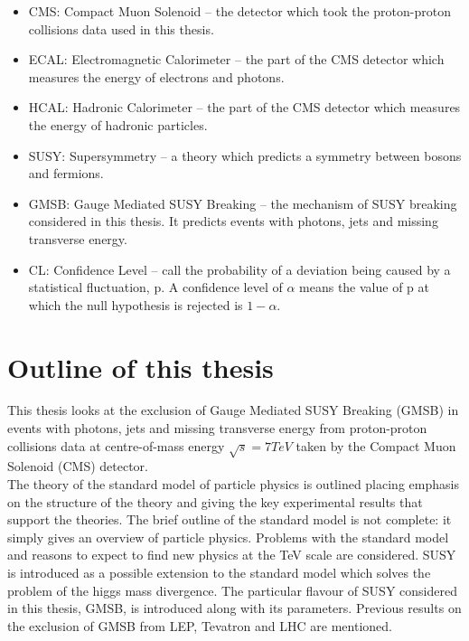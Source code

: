 \begin{itemize}
\item CMS: Compact Muon Solenoid -- the detector which took the proton-proton
collisions data used in this thesis.
\item ECAL: Electromagnetic Calorimeter -- the part of the CMS detector which 
measures the energy of electrons and photons.
\item HCAL: Hadronic Calorimeter -- the part of the CMS detector which measures
the energy of hadronic particles.
\item SUSY: Supersymmetry -- a theory which predicts a symmetry between bosons
and fermions. 
\item GMSB: Gauge Mediated SUSY Breaking -- the mechanism of SUSY breaking
considered in this thesis. It predicts events with photons, jets and missing
transverse energy.
\item CL: Confidence Level -- call the probability of a deviation being caused
by a statistical fluctuation, p. A confidence level of $\alpha$ means the value 
of p at which the null hypothesis is rejected is $1-\alpha$.
\end{itemize}

\section{Outline of this thesis}

This thesis looks at the exclusion of Gauge Mediated SUSY Breaking (GMSB) in
events with photons, jets and missing transverse energy from proton-proton
collisions data at centre-of-mass energy $\sqrt{s}=7\unit{TeV}$ taken by the
Compact Muon Solenoid (CMS) detector. \\

The theory of the standard model of particle physics is outlined placing
emphasis on the structure of the theory and giving the key experimental results
that support the theories. The brief outline of the standard model is not
complete: it simply gives an overview of particle physics. Problems with the
standard model and reasons to expect to find new physics at the TeV scale are
considered. SUSY is introduced as a possible extension to the standard model
which solves the problem of the higgs mass divergence. The particular flavour of
SUSY considered in this thesis, GMSB, is introduced along with its parameters.
Previous results on the exclusion of GMSB from LEP, Tevatron and LHC are
mentioned. \\

